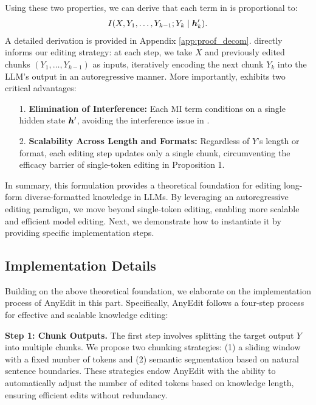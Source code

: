 Using these two properties, we can derive that each term in  is proportional to:
\begin{equation}
    \begin{aligned}
        I(X, Y_1, \dots, Y_{k-1}; Y_k \mid {\bm{h}}'_k). \label{eq:final_MI}
    \end{aligned}
\end{equation}
A detailed derivation is provided in Appendix \ref{app:proof_decom}.
 directly informs our editing strategy: at each step, we take $X$ and previously edited chunks $(Y_1, \dots, Y_{k-1})$ as inputs, iteratively encoding the next chunk $Y_k$ into the LLM's output in an autoregressive manner.
More importantly,  exhibits two critical advantages:
\begin{itemize}[leftmargin=*]
    \item[1.] \textbf{Elimination of Interference:} Each MI term conditions on a single hidden state ${\bm{h}}'$, avoiding the interference issue in .
    \item[2. ] \textbf{Scalability Across Length and Formats:} Regardless of $Y$'s length or format, each editing step updates only a single chunk, circumventing the efficacy barrier of single-token editing in Proposition 1.
\end{itemize}

In summary, this formulation provides a theoretical foundation for editing long-form diverse-formatted knowledge in LLMs. By leveraging an autoregressive editing paradigm, we move beyond single-token editing, enabling more scalable and efficient model editing. Next, we demonstrate how to instantiate it by providing specific implementation steps.

\subsection{Implementation Details} \label{sec:any_imp}
Building on the above theoretical foundation, we elaborate on the implementation process of AnyEdit in this part. Specifically, AnyEdit follows a four-step process for effective and scalable knowledge editing:

\textbf{Step 1: Chunk Outputs.} 
The first step involves splitting the target output $Y$ into multiple chunks. We propose two chunking strategies: (1) a sliding window with a fixed number of tokens and (2) semantic segmentation based on natural sentence boundaries.
These strategies endow AnyEdit with the ability to automatically adjust the number of edited tokens based on knowledge length, ensuring efficient edits without redundancy.

